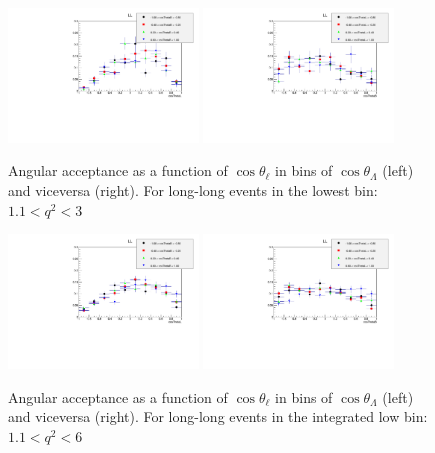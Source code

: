\begin{figure}[h!]
\includegraphics[width=0.45\textwidth]{Lmumu/figs/effs/LLeff_lowestq2.pdf}
\includegraphics[width=0.45\textwidth]{Lmumu/figs/effs/LLBeff_lowestq2.pdf}
\caption{Angular acceptance as a function of $\cos\theta_\ell$ in bins of $\cos\theta_\Lambda$ (left) and viceversa (right). For long-long events in the lowest \qsq bin: $1.1 < q^2 < 3$}
\end{figure}



\begin{figure}[h!]
\includegraphics[width=0.45\textwidth]{Lmumu/figs/effs/LLeff_lowq2.pdf}
\includegraphics[width=0.45\textwidth]{Lmumu/figs/effs/LLBeff_lowq2.pdf}
\caption{Angular acceptance as a function of $\cos\theta_\ell$ in bins of $\cos\theta_\Lambda$ (left) and viceversa (right). For long-long events in the integrated low \qsq bin: $1.1 < q^2 < 6$}
\end{figure}



